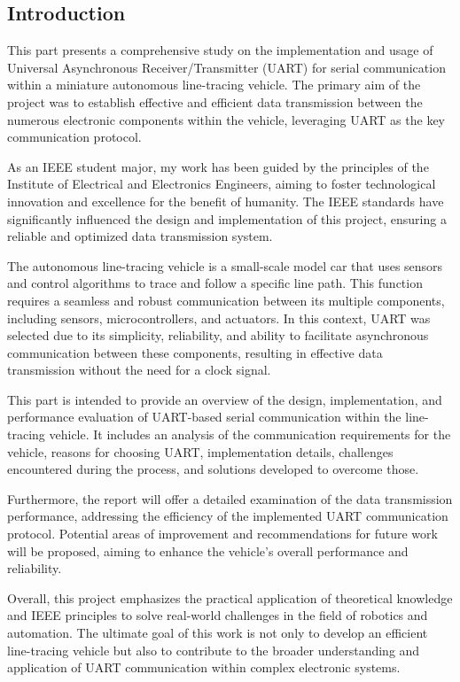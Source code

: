 \documentclass[12pt, a4paper, oneside]{report}
\begin{document}
\subsection{Introduction}
This part presents a comprehensive study on the implementation and usage of Universal Asynchronous Receiver/Transmitter (UART) for serial communication within a miniature autonomous line-tracing vehicle. The primary aim of the project was to establish effective and efficient data transmission between the numerous electronic components within the vehicle, leveraging UART as the key communication protocol.

As an IEEE student major, my work has been guided by the principles of the Institute of Electrical and Electronics Engineers, aiming to foster technological innovation and excellence for the benefit of humanity. The IEEE standards have significantly influenced the design and implementation of this project, ensuring a reliable and optimized data transmission system.

The autonomous line-tracing vehicle is a small-scale model car that uses sensors and control algorithms to trace and follow a specific line path. This function requires a seamless and robust communication between its multiple components, including sensors, microcontrollers, and actuators. In this context, UART was selected due to its simplicity, reliability, and ability to facilitate asynchronous communication between these components, resulting in effective data transmission without the need for a clock signal.

This part is intended to provide an overview of the design, implementation, and performance evaluation of UART-based serial communication within the line-tracing vehicle. It includes an analysis of the communication requirements for the vehicle, reasons for choosing UART, implementation details, challenges encountered during the process, and solutions developed to overcome those.

Furthermore, the report will offer a detailed examination of the data transmission performance, addressing the efficiency of the implemented UART communication protocol. Potential areas of improvement and recommendations for future work will be proposed, aiming to enhance the vehicle's overall performance and reliability.

Overall, this project emphasizes the practical application of theoretical knowledge and IEEE principles to solve real-world challenges in the field of robotics and automation. The ultimate goal of this work is not only to develop an efficient line-tracing vehicle but also to contribute to the broader understanding and application of UART communication within complex electronic systems.
\end{document}
